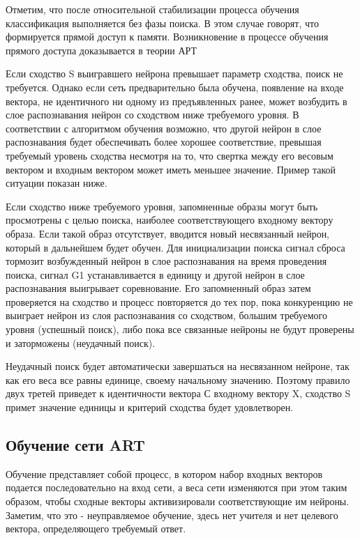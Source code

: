 \documentclass[14pt,a4paper,report]{article}
\begin{document}
Отметим, что после относительной стабилизации процесса обучения классификация выполняется без фазы поиска. В этом случае говорят, что формируется прямой доступ к памяти. Возникновение в процессе обучения прямого доступа доказывается в теории АРТ \cite{cite-lek-narod}

Если сходство S выигравшего нейрона превышает параметр сходства, поиск не требуется. Однако если сеть предварительно была обучена, появление на входе вектора, не идентичного ни одному из предъявленных ранее, может возбудить в слое распознавания нейрон со сходством ниже требуемого уровня. В соответствии с алгоритмом обучения возможно, что другой нейрон в слое распознавания будет обеспечивать более хорошее соответствие, превышая требуемый уровень сходства несмотря на то, что свертка между его весовым вектором и входным вектором может иметь меньшее значение. Пример такой ситуации показан ниже.
 
Если сходство ниже требуемого уровня, запомненные образы могут быть просмотрены с целью поиска, наиболее соответствующего входному вектору образа. Если такой образ отсутствует, вводится новый несвязанный нейрон, который в дальнейшем будет обучен. Для инициализации поиска сигнал сброса тормозит возбужденный нейрон в слое распознавания на время проведения поиска, сигнал G1 устанавливается в единицу и другой нейрон в слое распознавания выигрывает соревнование. Его запомненный образ затем проверяется на сходство и процесс повторяется до тех пор, пока конкуренцию не выиграет нейрон из слоя распознавания со сходством, большим требуемого уровня (успешный поиск), либо пока все связанные нейроны не будут проверены и заторможены (неудачный поиск).
 
Неудачный поиск будет автоматически завершаться на несвязанном нейроне, так как его веса все равны единице, своему начальному значению. Поэтому правило двух третей приведет к идентичности вектора С входному вектору X, сходство S примет значение единицы и критерий сходства будет удовлетворен.

\subsection{Обучение сети ART}

Обучение представляет собой процесс, в котором набор входных векторов подается последовательно на вход сети, а веса сети изменяются при этом таким образом, чтобы сходные векторы активизировали соответствующие им нейроны. Заметим, что это - неуправляемое обучение, здесь нет учителя и нет целевого вектора, определяющего требуемый ответ.
\end{document}
